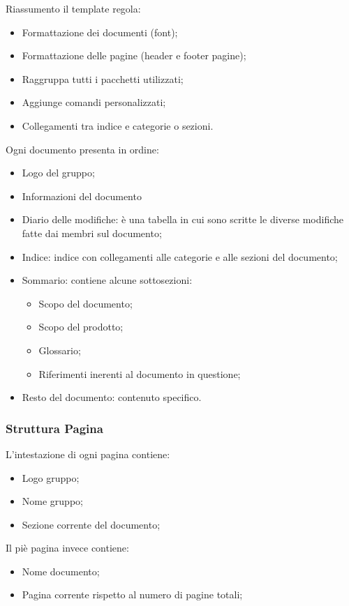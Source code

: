 \documentclass{scalatekids-article}
\begin{document}
Riassumento il template regola:
\begin{itemize}
\item Formattazione dei documenti (font);
\item Formattazione delle pagine (header e footer pagine);
\item Raggruppa tutti i pacchetti utilizzati;
\item Aggiunge comandi personalizzati;
\item Collegamenti tra indice e categorie o sezioni.
\end{itemize}
Ogni documento presenta in ordine:
\begin{itemize}
\item Logo del gruppo;
\item Informazioni del documento
\item Diario delle modifiche: è una tabella in cui sono scritte le diverse modifiche fatte dai membri sul documento;
\item Indice: indice con collegamenti alle categorie e alle sezioni del documento;
\item Sommario: contiene alcune sottosezioni:
  \begin{itemize}
  \item Scopo del documento;
  \item Scopo del prodotto;
  \item Glossario;
  \item Riferimenti inerenti al documento in questione;
  \end{itemize}
\item Resto del documento: contenuto specifico.
\end{itemize}

\subsubsection{Struttura Pagina}
L'intestazione di ogni pagina contiene:
\begin{itemize}
\item Logo gruppo;
\item Nome gruppo;
\item Sezione corrente del documento;
\end{itemize}
Il piè pagina invece contiene:
\begin{itemize}
\item Nome documento;
\item Pagina corrente rispetto al numero di pagine totali;
\end{itemize}
\end{document}
